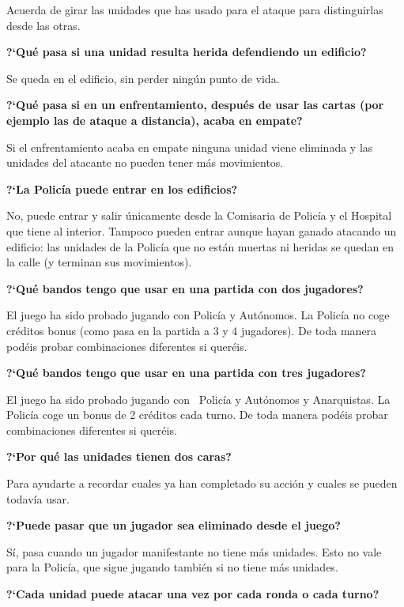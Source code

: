 \documentclass[a4paper,13pt]{scrartcl}
\begin{document}
Acuerda de girar las unidades que has usado para el ataque para distinguirlas desde las otras.
\bigskip

{\bfseries
?`Qu\'e pasa si una unidad resulta herida defendiendo un edificio?} \nopagebreak

Se queda en el edificio, sin perder ning\'un punto de vida.
\bigskip

{\bfseries
?`Qu\'e pasa si en un enfrentamiento, despu\'es de usar las cartas (por ejemplo las de ataque a distancia), acaba en
empate?} \nopagebreak

Si el enfrentamiento acaba en empate ninguna unidad viene eliminada y las unidades del atacante no pueden tener m\'as
movimientos.
\bigskip

{\bfseries
?`La Polic\'ia puede entrar en los edificios?} \nopagebreak

No, puede entrar y salir \'unicamente desde la Comisaria de Polic\'ia y el Hospital que tiene al interior. Tampoco
pueden entrar aunque hayan ganado atacando un edificio: las unidades de la Polic\'ia que no est\'an muertas ni heridas
se quedan en la calle (y terminan sus movimientos).
\bigskip

{\bfseries
?`Qu\'e bandos tengo que usar en una partida con dos jugadores?} \nopagebreak

El juego ha sido probado jugando con Polic\'ia y Aut\'onomos. La Polic\'ia no coge cr\'editos bonus (como pasa en la
partida a 3 y 4 jugadores). De toda manera pod\'eis probar combinaciones diferentes si quer\'eis.
\bigskip

{\bfseries
?`Qu\'e bandos tengo que usar en una partida con tres jugadores?} \nopagebreak

El juego ha sido probado jugando con \ Polic\'ia y Aut\'onomos y Anarquistas. La Polic\'ia coge un bonus de 2 cr\'editos
cada turno. De toda manera pod\'eis probar combinaciones diferentes si quer\'eis.
\bigskip

{\bfseries
?`Por qu\'e las unidades tienen dos caras?} \nopagebreak

Para ayudarte a recordar cuales ya han completado su acci\'on y cuales se pueden todav\'ia usar.
\bigskip

{\bfseries
?`Puede pasar que un jugador sea eliminado desde el juego?} \nopagebreak

S\'i, pasa cuando un jugador manifestante no tiene m\'as unidades. Esto no vale para la Polic\'ia, que sigue jugando tambi\'en si no tiene m\'as unidades.
\bigskip

{\bfseries
?`Cada unidad puede atacar una vez por cada ronda o cada turno?} \nopagebreak
\end{document}
